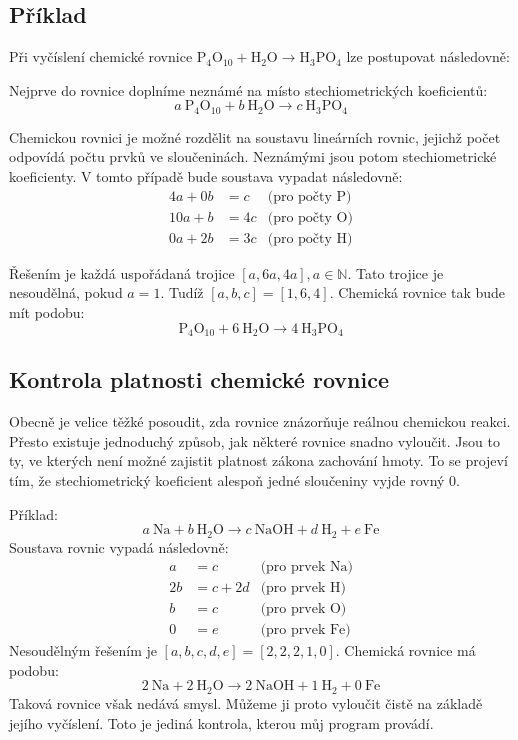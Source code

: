\documentclass[12pt,a4paper]{report}
\newcommand{\n}[1]{\mbox{#1}}
\newcommand{\sipka}{\rightarrow}
\begin{document}
\subsection{Příklad}
Při vyčíslení chemické rovnice $ \n{P}_4\n{O}_{10} + \n{H}_2\n{O} \sipka \n{H}_3\n{PO}_4 $ lze postupovat následovně:

Nejprve do rovnice doplníme neznámé na místo stechiometrických koeficientů:
$$ a~\n{P}_4\n{O}_{10} + b~\n{H}_2\n{O} \sipka c~\n{H}_3\n{PO}_4 $$

Chemickou rovnici je možné rozdělit na soustavu lineárních rovnic, jejichž počet odpovídá počtu prvků ve sloučeninách. Neznámými jsou potom stechio\-met\-ric\-ké koeficienty. V tomto případě bude soustava vypadat následovně:
\begin{align*}
	4a + 0b &= c&\mbox{(pro počty P)}\\
	10a + b &= 4c&\mbox{(pro počty O)}\\
	0a + 2b &= 3c&\mbox{(pro počty H)}
\end{align*}

Řešením je každá uspořádaná trojice $ [a, 6a, 4a], a\in \mathbb{N} $. Tato trojice je nesoudělná, pokud $ a = 1 $. Tudíž $ [a,b,c] = [1,6,4] $. Chemická rovnice tak bude mít podobu:
$$ \n{P}_4\n{O}_{10} + 6~\n{H}_2\n{O} \sipka 4~\n{H}_3\n{PO}_4 $$

\subsection{Kontrola platnosti chemické rovnice}
Obecně je velice těžké posoudit, zda rovnice znázorňuje reálnou chemickou reakci. Přesto existuje jednoduchý způsob, jak některé rovnice snadno vyloučit. Jsou to ty, ve kterých není možné zajistit platnost zákona zachování hmoty. To se projeví tím, že stechiometrický koeficient alespoň jedné sloučeniny vyjde rovný 0.

Příklad:
$$a~\n{Na} + b~\n{H}_2\n{O} \sipka c~\n{NaOH}+d~\n{H}_2 + e~\n{Fe}$$
Soustava rovnic vypadá následovně:
\begin{align*}
	a &= c &\mbox{(pro prvek Na)}\\
	2b &= c + 2d &\mbox{(pro prvek H)}\\
	b &= c &\mbox{(pro prvek O)}\\
	0 &= e &\mbox{(pro prvek Fe)}
\end{align*} 
Nesoudělným řešením je $[a,b,c,d,e]=[2,2,2,1,0]$. Chemická rovnice má podobu:
$$2~\n{Na} + 2~\n{H}_2\n{O} \sipka 2~\n{NaOH}+1~\n{H}_2 + 0~\n{Fe}$$
Taková rovnice však nedává smysl. Můžeme ji proto vyloučit čistě na základě jejího vyčíslení. Toto je jediná kontrola, kterou můj program provádí.
\end{document}
